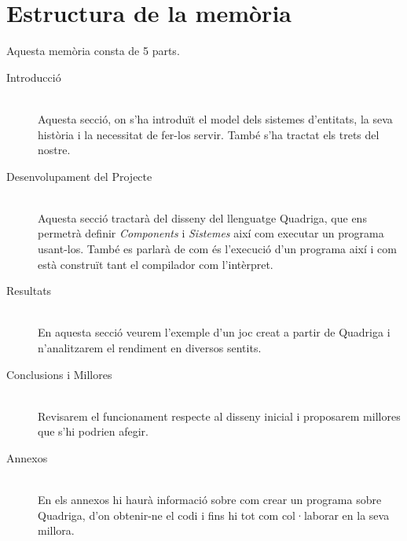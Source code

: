 \section{Estructura de la memòria}

Aquesta memòria consta de 5 parts.

\begin{description}
  \item[Introducció] \hfill \\
    Aquesta secció, on s'ha introduït el model dels sistemes d'entitats, la seva història i la necessitat de fer-los servir. També s'ha tractat els trets del nostre.
    
  \item[Desenvolupament del Projecte] \hfill \\
    Aquesta secció tractarà del disseny del llenguatge Quadriga, que ens permetrà definir {\em Components} i {\em Sistemes} així com executar un programa usant-los. També es parlarà de com és l'execució d'un programa així i com està construït tant el compilador com l'intèrpret.
    
  \item[Resultats] \hfill \\
    En aquesta secció veurem l'exemple d'un joc creat a partir de Quadriga i n'analitzarem el rendiment en diversos sentits.
    
  \item[Conclusions i Millores] \hfill \\
    Revisarem el funcionament respecte al disseny inicial i proposarem millores que s'hi podrien afegir.
  
  \item[Annexos] \hfill \\
    En els annexos hi haurà informació sobre com crear un programa sobre Quadriga, d'on obtenir-ne el codi i fins hi tot com col·laborar en la seva millora.
    
\end{description}
